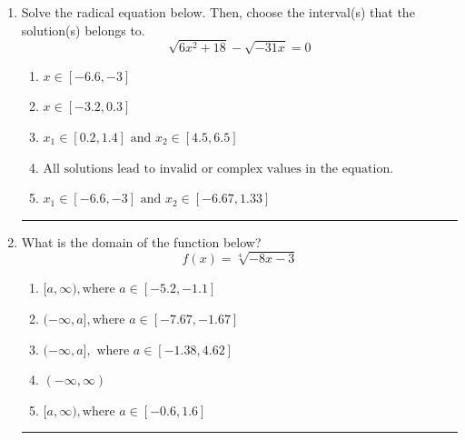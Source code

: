 \documentclass[14pt]{extbook}
\newcommand{\litem}[1]{\item#1\hspace*{-1cm}\rule{\textwidth}{0.4pt}}
\begin{document}
\begin{enumerate}
\litem{
Solve the radical equation below. Then, choose the interval(s) that the solution(s) belongs to.\[ \sqrt{6 x^2 + 18} - \sqrt{-31 x} = 0 \]\begin{enumerate}[label=\Alph*.]
\item \( x \in [-6.6,-3] \)
\item \( x \in [-3.2,0.3] \)
\item \( x_1 \in [0.2, 1.4] \text{ and } x_2 \in [4.5,6.5] \)
\item \( \text{All solutions lead to invalid or complex values in the equation.} \)
\item \( x_1 \in [-6.6, -3] \text{ and } x_2 \in [-6.67,1.33] \)

\end{enumerate} }
\litem{
What is the domain of the function below?\[ f(x) = \sqrt[4]{-8 x - 3} \]\begin{enumerate}[label=\Alph*.]
\item \( [a, \infty), \text{where } a \in [-5.2, -1.1] \)
\item \( (-\infty, a], \text{where } a \in [-7.67, -1.67] \)
\item \( (-\infty, a], \text{ where } a \in [-1.38, 4.62] \)
\item \( (-\infty, \infty) \)
\item \( [a, \infty), \text{where } a \in [-0.6, 1.6] \)


\end{enumerate}}
\end{enumerate}
\end{document}
